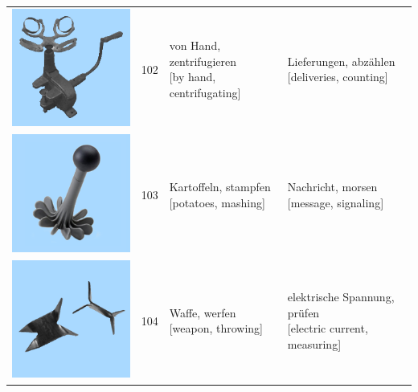 \documentclass[
  english,
  doc,12pt,twoside,floatsintext]{apa7}
\begin{document}
\begin{center}
\begin{ThreePartTable}
{\begin{longtable}{llll}
\includegraphics[valign=c, scale=0.23]{../materials/unfamiliar/102.png} & 102 & \makecell[l]{von Hand, zentrifugieren\\{[by hand, centrifugating]}} & \makecell[l]{Lieferungen, abzählen\\{[deliveries, counting]}}\\
\includegraphics[valign=c, scale=0.23]{../materials/unfamiliar/103.png} & 103 & \makecell[l]{Kartoffeln, stampfen\\{[potatoes, mashing]}} & \makecell[l]{Nachricht, morsen\\{[message, signaling]}}\\
\includegraphics[valign=c, scale=0.23]{../materials/unfamiliar/104.png} & 104 & \makecell[l]{Waffe, werfen\\{[weapon, throwing]}} & \makecell[l]{elektrische Spannung, prüfen\\{[electric current, measuring]}}\\

\end{longtable}}
\end{ThreePartTable}
\end{center}
\end{document}
